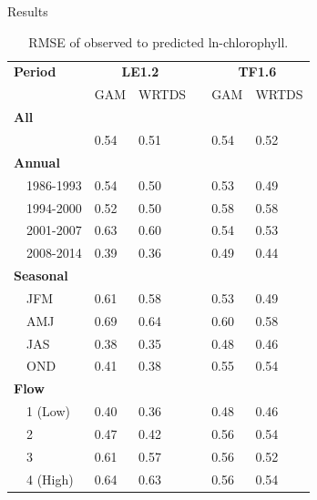\documentclass[serif]{beamer}\usepackage[]{graphicx}\usepackage[]{color}
\begin{document}
\begin{frame}{Results}
\scriptsize
\begin{table}[!tbp]
\caption{RMSE of observed to predicted ln-chlorophyll.\label{tab:perftoobs}} 
\begin{center}
\begin{tabular}{lllcll}
\hline\hline
\multicolumn{1}{l}{\bfseries Period}&\multicolumn{2}{c}{\bfseries LE1.2}&\multicolumn{1}{c}{\bfseries }&\multicolumn{2}{c}{\bfseries TF1.6}\tabularnewline
\cline{2-3} \cline{5-6}
\multicolumn{1}{l}{}&\multicolumn{1}{c}{GAM}&\multicolumn{1}{c}{WRTDS}&\multicolumn{1}{c}{}&\multicolumn{1}{c}{GAM}&\multicolumn{1}{c}{WRTDS}\tabularnewline
\hline
{\bfseries All}&&&&&\tabularnewline
~~&0.54&0.51&&0.54&0.52\tabularnewline
\hline
{\bfseries Annual}&&&&&\tabularnewline
~~1986-1993&0.54&0.50&&0.53&0.49\tabularnewline
~~1994-2000&0.52&0.50&&0.58&0.58\tabularnewline
~~2001-2007&0.63&0.60&&0.54&0.53\tabularnewline
~~2008-2014&0.39&0.36&&0.49&0.44\tabularnewline
\hline
{\bfseries Seasonal}&&&&&\tabularnewline
~~JFM&0.61&0.58&&0.53&0.49\tabularnewline
~~AMJ&0.69&0.64&&0.60&0.58\tabularnewline
~~JAS&0.38&0.35&&0.48&0.46\tabularnewline
~~OND&0.41&0.38&&0.55&0.54\tabularnewline
\hline
{\bfseries Flow}&&&&&\tabularnewline
~~1 (Low)&0.40&0.36&&0.48&0.46\tabularnewline
~~2&0.47&0.42&&0.56&0.54\tabularnewline
~~3&0.61&0.57&&0.56&0.52\tabularnewline
~~4 (High)&0.64&0.63&&0.56&0.54\tabularnewline
\hline
\end{tabular}\end{center}

\end{table}

\end{frame}
\end{document}
